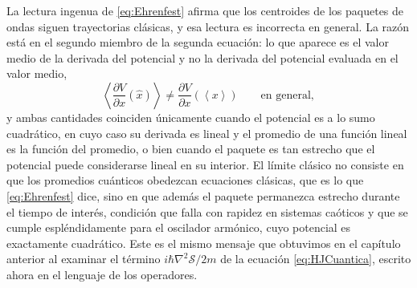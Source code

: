         La lectura ingenua de \eqref{eq:Ehrenfest} afirma que los centroides de los paquetes de ondas siguen trayectorias clásicas, y esa lectura es incorrecta en general. La razón está en el segundo miembro de la segunda ecuación: lo que aparece es el valor medio de la derivada del potencial y no la derivada del potencial evaluada en el valor medio,
        \begin{equation}\label{eq:EhrenfestObjecion}
            \left\langle\frac{\partial V}{\partial x}(\hat{x})\right\rangle \neq \frac{\partial V}{\partial x}\left(\left\langle x\right\rangle\right)
            \qquad\text{en general},
        \end{equation}
        y ambas cantidades coinciden únicamente cuando el potencial es a lo sumo cuadrático, en cuyo caso su derivada es lineal y el promedio de una función lineal es la función del promedio, o bien cuando el paquete es tan estrecho que el potencial puede considerarse lineal en su interior. El límite clásico no consiste en que los promedios cuánticos obedezcan ecuaciones clásicas, que es lo que \eqref{eq:Ehrenfest} dice, sino en que además el paquete permanezca estrecho durante el tiempo de interés, condición que falla con rapidez en sistemas caóticos y que se cumple espléndidamente para el oscilador armónico, cuyo potencial es exactamente cuadrático. Este es el mismo mensaje que obtuvimos en el capítulo anterior al examinar el término $i\hbar\nabla^{2}\mathcal{S}/2m$ de la ecuación \eqref{eq:HJCuantica}, escrito ahora en el lenguaje de los operadores.

